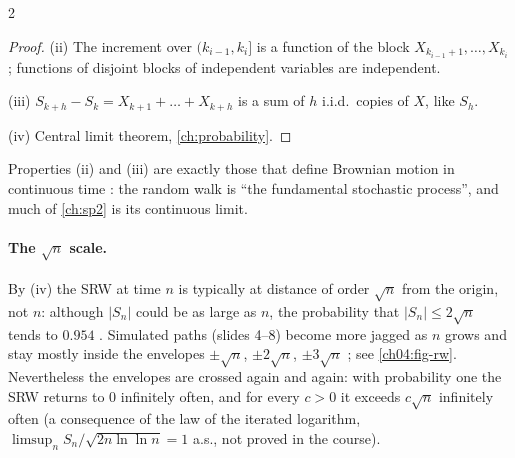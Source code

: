 \begin{paracol}{2}
\begin{proof}
(ii) The increment over $(k_{i-1},k_i]$ is a function of the block $X_{k_{i-1}+1},\dots,X_{k_i}$;
functions of disjoint blocks of independent variables are independent.

(iii) $S_{k+h}-S_k=X_{k+1}+\dots+X_{k+h}$ is a sum of $h$ i.i.d.\ copies of $X$, like $S_h$.

(iv) Central limit theorem, \cref{ch:probability}.
\end{proof}
Properties (ii) and (iii) are exactly those that define Brownian motion in continuous time
: the random walk is ``the fundamental stochastic process'', and much of
\cref{ch:sp2} is its continuous limit.

\paragraph{The $\sqrt n$ scale.} By (iv) the SRW at time $n$ is typically at distance of order
$\sqrt n$ from the origin, not $n$: although $|S_n|$ could be as large as $n$, the probability that
$|S_n|\le 2\sqrt n$ tends to $0.954$ . Simulated paths (slides 4--8) become more
jagged as $n$ grows and stay mostly inside the envelopes $\pm\sqrt n$, $\pm2\sqrt n$, $\pm3\sqrt n$
; see \cref{ch04:fig-rw}. Nevertheless the envelopes are crossed again and again: with
probability one the SRW returns to $0$ infinitely often, and for every $c>0$ it exceeds $c\sqrt n$
infinitely often  (a consequence of the law of the iterated logarithm,
$\limsup_n S_n/\sqrt{2n\ln\ln n}=1$ a.s., not proved in the course).


\end{paracol}
